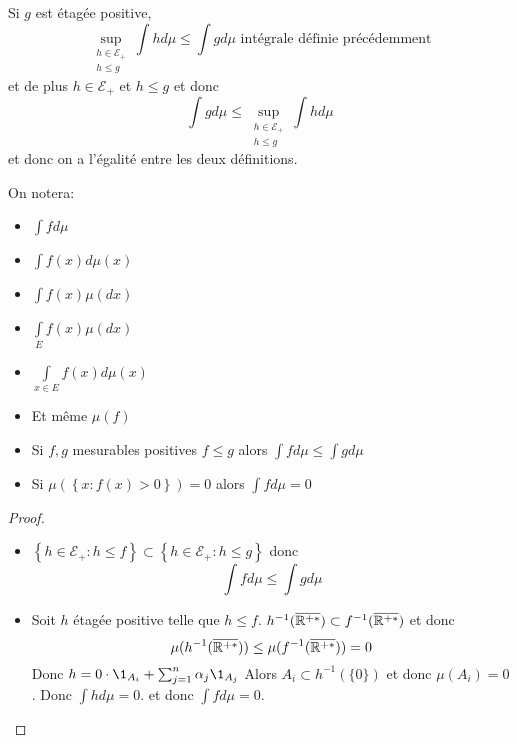 \begin{remarque}
	Si $g$ est étagée positive,
	$$\sup\limits_{\substack{h \in \mathcal{E}_+ \\ h \leq g}} \int h d\mu \leq \int g d\mu \text{ intégrale définie précédemment}$$
	et de plus $h \in \mathcal{E}_+$ et $h \leq g$ et donc
	$$ \int g d\mu \leq \sup\limits_{\substack{h \in \mathcal{E}_+ \\ h \leq g}} \int h d\mu $$
	et donc on a l'égalité entre les deux définitions.
\end{remarque}

\begin{remarque}
	On notera:
	\begin{itemize}
		\item $\int f d\mu$
		\item $\int f(x) d\mu(x)$
		\item $\int f(x) \mu(dx)$
		\item $\int\limits_E f(x) \mu(dx)$
		\item $\int\limits_{x\in E} f(x) d\mu(x)$
		\item Et même $\mu(f)$
	\end{itemize}
\end{remarque}


\begin{prop} \label{prop:croi-et-sep}
	\begin{itemize}
		\item Si $f,g$ mesurables positives $f \leq g$ alors $\int f d\mu \leq \int g d\mu$
		\item Si $\mu(\left\{x : f(x) > 0\right\}) = 0$ alors $\int f d\mu = 0$
	\end{itemize}
\end{prop}

\begin{proof}
	\begin{itemize}
		\item $\left\{ h \in \mathcal{E}_+ : h \leq f \right\} \subset \left\{ h \in \mathcal{E}_+ : h \leq g \right\}$ donc
		      $$ \int f d\mu \leq \int g d\mu $$
		\item Soit $h$ étagée positive telle que $h \leq f$.
		      $h^{-1}(\overline{\mathbb{R}^{+*}}) \subset f^{-1}(\overline{\mathbb{R}^{+*}})$ et donc
		      $$ \mu(h^{-1}(\overline{\mathbb{R}^{+*}})) \leq \mu(f^{-1}(\overline{\mathbb{R}^{+*}})) = 0 $$
		      Donc $h = 0 \cdot \1_{A_i} + \sum_{j=1}^n \alpha_j \1_{A_j}$
		      Alors $A_i \subset h^{-1}(\{0\})$ et donc $\mu(A_i) = 0$.
		      Donc $\int h d\mu = 0$.
		      et donc $\int f d\mu = 0$.
	\end{itemize}
\end{proof}



